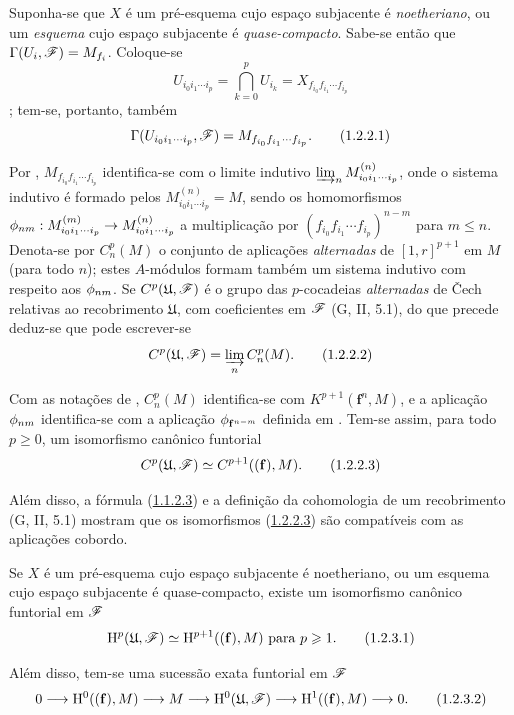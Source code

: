 \begin{env}[1.2.2]
\label{III.1.2.2}
Suponha-se que $X$ é um pré-esquema cujo espaço subjacente é \emph{noetheriano}, ou um \emph{esquema} cujo espaço subjacente é \emph{quase-compacto}.
Sabe-se então  que $\Gamma(U_i,\mathscr{F})=M_{f_i}$.
Coloque-se
\[
  U_{i_0 i_1\cdots i_p}=\bigcap_{k=0}^p U_{i_k}=X_{f_{i_0}f_{i_1}\cdots f_{i_p}}
\]
; tem-se, portanto, também
\[
  \Gamma(U_{i_0 i_1\cdots i_p},\mathscr{F})=M_{f_{i_0}f_{i_1}\cdots f_{i_p}}.
  \tag{1.2.2.1}
\]

Por , $M_{f_{i_0}f_{i_1}\cdots f_{i_p}}$ identifica-se com o limite indutivo $\varinjlim_n M_{i_0 i_1\cdots i_p}^{(n)}$, onde o sistema indutivo é formado pelos $M_{i_0 i_1\cdots i_p}^{(n)}=M$, sendo os homomorfismos $\vphi_{nm}:M_{i_0 i_1\cdots i_p}^{(m)}\to M_{i_0 i_1\cdots i_p}^{(n)}$ a multiplicação por $(f_{i_0}f_{i_1}\cdots f_{i_p})^{n-m}$ para $m\leq n$.
Denota-se por $C_n^p(M)$ o conjunto de aplicações \emph{alternadas} de $[1,r]^{p+1}$ em $M$ (para todo $n$); estes $A$-módulos formam também um sistema indutivo com respeito aos $\phi_{nm}$.
Se $C^p(\mathfrak{U},\mathscr{F})$ é o grupo das $p$-cocadeias \emph{alternadas} de \v Cech relativas ao recobrimento $\mathfrak{U}$, com coeficientes em $\mathscr{F}$ (G, II, 5.1), do que precede deduz-se que pode escrever-se
\[
  C^p(\mathfrak{U},\mathscr{F})=\varinjlim_n C_n^p(M).
  \tag{1.2.2.2}
\]

Com as notações de , $C_n^p(M)$ identifica-se com $K^{p+1}(\mathbf{f}^n,M)$, e a aplicação $\phi_{nm}$ identifica-se com a aplicação $\phi_{\mathbf{f}^{n-m}}$ definida em .
Tem-se assim, para todo $p\geq 0$, um isomorfismo canônico funtorial
\[
  C^p(\mathfrak{U},\sh{F})\isoto C^{p+1}((\mathbf{f}),M).
  \tag{1.2.2.3}\label{III.1.2.2.3}
\]

Além disso, a fórmula (\hyperref[III.1.1.2.3]{1.1.2.3}) e a definição da cohomologia de um recobrimento (G, II, 5.1) mostram que os isomorfismos (\hyperref[III.1.2.2.3]{1.2.2.3}) são compatíveis com as aplicações cobordo.
\end{env}

\begin{proposition}[1.2.3]
\label{III.1.2.3}
Se $X$ é um pré-esquema cujo espaço subjacente é noetheriano, ou um esquema cujo espaço subjacente é quase-compacto, existe um isomorfismo canônico funtorial em $\mathscr{F}$
\[
  \HH^p(\mathfrak{U},\sh{F})\isoto\HH^{p+1}((\mathbf{f}),M)\text{ para }p\geq 1.
  \tag{1.2.3.1}\label{III.1.2.3.1}
\]

Além disso, tem-se uma sucessão exata funtorial em $\mathscr{F}$
\[
  0\to\HH^0((\mathbf{f}),M)\to M\to\HH^0(\mathfrak{U},\sh{F})\to\HH^1((\mathbf{f}),M)\to 0.
  \tag{1.2.3.2}\label{III.1.2.3.2}
\]
\end{proposition}

